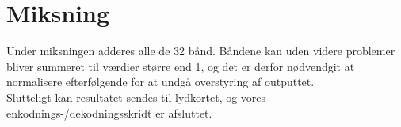 \section{Miksning}
Under miksningen adderes alle de 32 bånd. Båndene kan uden videre
problemer bliver summeret til værdier større end 1, og det er derfor
nødvendgit at normalisere efterfølgende for at undgå overstyring af
outputtet.\\
Slutteligt kan resultatet sendes til lydkortet, og vores
enkodnings-/dekodningsskridt er afsluttet.
